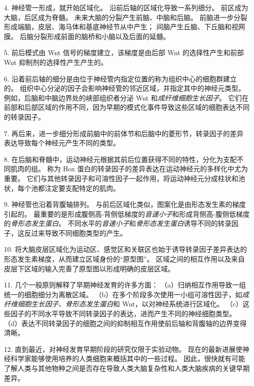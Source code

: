 4. 神经管一形成，就开始区域化。
沿前后轴的区域化导致一系列细分。
前区成为大脑，后区成为脊髓。 未来大脑的分裂产生前脑、中脑和后脑。
前脑进一步分裂形成端脑，皮层、海马体和基底神经节从中产生；
间脑产生丘脑、下丘脑和视网膜。
后脑分裂形成前面的脑桥和小脑以及后面的延髓。


5. 前后模式由 Wnt 信号的梯度建立，该梯度是由后部 Wnt 的选择性产生和前部 Wnt 抑制剂的选择性产生产生的。


6. 沿着前后轴的细分是由位于神经管内指定位置的称为组织中心的细胞群建立的。
组织中心分泌的因子会影响神经管的邻近区域，并指定其中的神经元类型。
例如，后脑和中脑边界处的峡部组织者分泌 Wnt 和\textit{成纤维细胞生长因子}。
它们在前部和后部区域的作用不同，因为早期的模式化事件导致这些区域的细胞表达不同的转录因子。


7. 再后来，进一步细分形成前脑中的前体节和后脑中的菱形节，转录因子的差异表达导致每个神经元产生不同的类型。 


8. 在后脑和脊髓中，运动神经元根据其前后位置获得不同的特性，分化为支配不同肌肉的组。
称为 Hox 蛋白的转录因子的差异表达在运动神经元的多样化中尤为重要。
它们与其他转录因子和可溶性因子一起作用，将运动神经元分成柱状和池状，每个池都注定要支配特定的肌肉。 


9. 神经管也沿着背腹轴排列。
与前后区域化类似，图案化是由形态发生素的梯度引起的。
最重要的是形成腹侧高-背侧低梯度的\textit{音速小子}和形成背侧高-腹侧低梯度的\textit{骨形态发生蛋白}。
不同水平的\textit{音速小子}和\textit{骨形态发生蛋白}诱导不同的转录因子，这反过来导致不同细胞类型的产生。 


10. 将大脑皮层区域化为运动区、感觉区和关联区也始于诱导转录因子差异表达的形态发生素梯度，从而建立区域身份的“原型图”。
区域之间的相互作用以及来自皮层下区域的输入完善了原型图以形成明确的皮层区域。 


11. 几个一般原则解释了早期神经发育的许多方面： 
（a）归纳相互作用导致一组统一的细胞细分为离散区域。
（b）在多个阶段多次使用一小组可溶性因子，如\textit{成纤维细胞生长因子}、\textit{骨形态发生蛋白}和 Wnt，以对神经系统进行区域化。
（c）这些因子的不同水平导致不同转录因子的表达，进而产生不同的神经细胞类型。
（d）表达不同转录因子的细胞之间的抑制相互作用使前后轴和背腹轴的边界变得清晰。


12. 直到最近，对神经发育早期阶段的研究仅限于实验动物。
现在的最新进展使神经科学家能够使用培养的人类细胞来概括其中的一些过程。
因此，很快就有可能了解人类与其他物种之间是否存在导致人类大脑复杂性和人类大脑疾病的关键早期差异。

